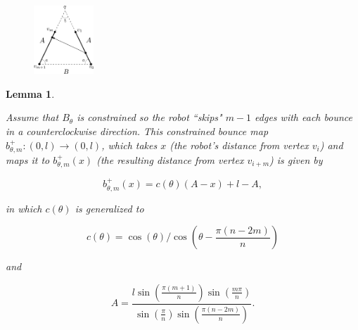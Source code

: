 \documentclass[letterpaper, 10 pt, conference]{ieeeconf}  %
\newtheorem{lemma}{\bf Lemma}
\begin{document}
\begin{figure}[bh]
\centering
\includegraphics[width=0.2\textwidth]{../figs/gen_bounce.pdf}
\end{figure}

\begin{lemma} \label{Lemma:3}

Assume that $B_{\theta}$ is constrained so the robot ``skips" $m-1$ edges with
each bounce in a counterclockwise direction. This constrained bounce
map $b^+_{\theta,m} : (0, l) \to (0, l)$, which takes $x$ (the
robot's distance from vertex $v_i$) and maps it to $b^+_{\theta,m}(x)$
(the resulting distance from vertex $v_{i+m}$) is given by

\begin{equation} \label{b-one-bounce}
b^+_{\theta,m}(x) = c(\theta)(A-x) + l - A,
\end{equation}


\noindent in which $c(\theta)$ is generalized to

\begin{equation} \label{equation:c_theta}
c(\theta) = \cos(\theta)/\cos \left(\theta - \frac{\pi(n-2m)}{n}\right)
\end{equation}

\noindent and

\begin{equation} \label{equation:A}
A = \frac{l \sin(\frac{\pi(m+1)}{n}) \sin( \frac{m \pi}{n} )}{ \sin(
\frac{\pi}{n} ) \sin( \frac{\pi(n-2m)}{n} ) } .
\end{equation}

%
\end{lemma}
\end{document}

